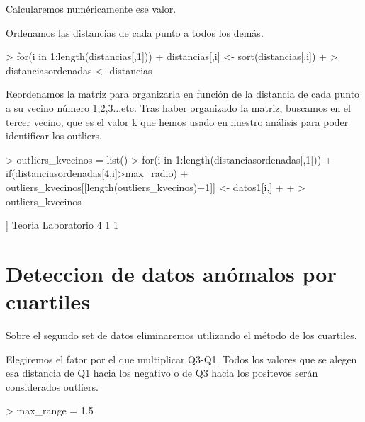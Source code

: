 \documentclass [a4paper] {article}
\begin{document}
Calcularemos numéricamente ese valor.

Ordenamos las distancias de cada punto a todos los demás.
\begin{Schunk}
\begin{Sinput}
> for(i in 1:length(distancias[,1])){
+   distancias[,i] <- sort(distancias[,i])
+ }
> distanciasordenadas <- distancias
\end{Sinput}
\end{Schunk}

Reordenamos la matriz para organizarla en función de la distancia de cada punto a su vecino número 1,2,3...etc. 
Tras haber organizado la matriz, buscamos en el tercer vecino, que es el valor k que hemos usado en nuestro análisis para poder identificar los outliers.
\begin{Schunk}
\begin{Sinput}
> outliers_kvecinos = list()
> for(i in 1:length(distanciasordenadas[,1])){
+   if(distanciasordenadas[4,i]>max_radio){
+     outliers_kvecinos[[length(outliers_kvecinos)+1]] <- datos1[i,]
+   }
+ }
> outliers_kvecinos
\end{Sinput}
\begin{Soutput}
[[1]]
  Teoria Laboratorio
4      1           1
\end{Soutput}
\end{Schunk}

\newpage
\section{Deteccion de datos anómalos por cuartiles}
Sobre el segundo set de datos eliminaremos utilizando el método de los cuartiles.

Elegiremos el fator por el que multiplicar Q3-Q1.
Todos los valores que se alegen esa distancia de Q1 hacia los negativo o de Q3 hacia los positevos serán considerados outliers.
\begin{Schunk}
\begin{Sinput}
> max_range = 1.5
\end{Sinput}
\end{Schunk}
\end{document}
